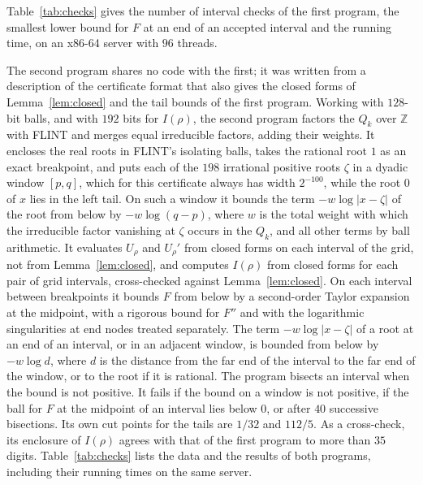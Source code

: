 \documentclass[11pt]{amsart}
\theoremstyle{remark}
\numberwithin{equation}{section}
\newcommand{\Z}{\mathbb{Z}}
\newcommand{\XLOB}{1/32}
\newcommand{\XHIB}{112/5}
\newcommand{\NWinB}{198}
\begin{document}
Table~\ref{tab:checks} gives the number of interval checks of the first program, the smallest lower bound for $F$ at an end of an accepted interval and the running time, on an x86-64 server with $96$ threads.

The second program shares no code with the first; it was written from a description of the certificate format that also gives the closed forms of Lemma~\ref{lem:closed} and the tail bounds of the first program. Working with $128$-bit balls, and with $192$ bits for $I(\rho)$, the second program factors the $Q_k$ over $\Z$ with FLINT and merges equal irreducible factors, adding their weights. It encloses the real roots in FLINT's isolating balls, takes the rational root $1$ as an exact breakpoint, and puts each of the $\NWinB$ irrational positive roots $\zeta$ in a dyadic window $[p,q]$, which for this certificate always has width $2^{-100}$, while the root $0$ of $x$ lies in the left tail. On such a window it bounds the term $-w\log|x-\zeta|$ of the root from below by $-w\log(q-p)$, where $w$ is the total weight with which the irreducible factor vanishing at $\zeta$ occurs in the $Q_k$, and all other terms by ball arithmetic. It evaluates $U_\rho$ and $U_\rho'$ from closed forms on each interval of the grid, not from Lemma~\ref{lem:closed}, and computes $I(\rho)$ from closed forms for each pair of grid intervals, cross-checked against Lemma~\ref{lem:closed}. On each interval between breakpoints it bounds $F$ from below by a second-order Taylor expansion at the midpoint, with a rigorous bound for $F''$ and with the logarithmic singularities at end nodes treated separately. The term $-w\log|x-\zeta|$ of a root at an end of an interval, or in an adjacent window, is bounded from below by $-w\log d$, where $d$ is the distance from the far end of the interval to the far end of the window, or to the root if it is rational. The program bisects an interval when the bound is not positive. It fails if the bound on a window is not positive, if the ball for $F$ at the midpoint of an interval lies below $0$, or after $40$ successive bisections. Its own cut points for the tails are $\XLOB$ and $\XHIB$. As a cross-check, its enclosure of $I(\rho)$ agrees with that of the first program to more than $35$ digits. Table~\ref{tab:checks} lists the data and the results of both programs, including their running times on the same server.
\end{document}
